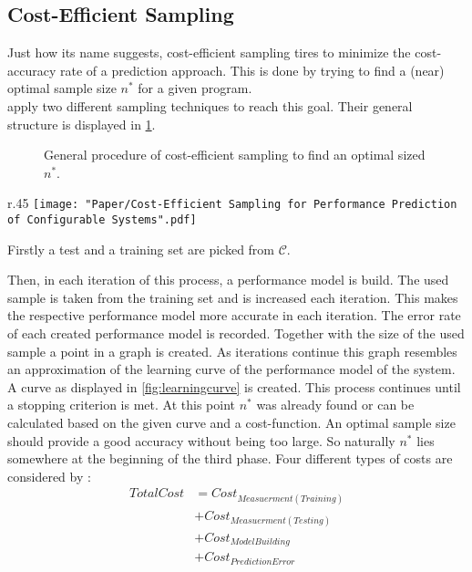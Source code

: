 \subsection{Cost-Efficient Sampling}\label{sec:CESampling}
Just how its name suggests, cost-efficient sampling tires to minimize the cost-accuracy rate of a prediction approach. This is done by trying to find a (near) optimal sample size $n^*$ for a given program.\\
\citet{CostEfficientSampling_Gou_Siegmund_2015} apply two different sampling techniques to reach this goal. Their general structure is displayed in \cref{fig:CEGeneral}.\\
\FloatBarrier
\begin{figure}[h]
	\centering
	\scalebox{.8}{
 		
 	}
 	\caption{General procedure of cost-efficient sampling to find an optimal sized $n^*$.}
 	\label{fig:CEGeneral}
\end{figure}
\begin{wrapfigure}{r}{.45\textwidth}	
	\texttt{[image: "Paper/Cost-Efficient Sampling for Performance Prediction of Configurable Systems".pdf]}
	\captionsetup{width=0.9\linewidth}
	\setlength{}
	\label{fig:learningcurve}
\end{wrapfigure}


Firstly a test and a training set are picked from $\mathcal{C}$.

Then, in each iteration of this process, a performance model is build. The used sample is taken from the training set and is increased each iteration. This makes the respective performance model more accurate in each iteration. The error rate of each created performance model is recorded. Together with the size of the used sample a point in a graph is created. As iterations continue this graph resembles an approximation of the learning curve of the performance model of the system. A curve as displayed in \cref{fig:learningcurve} is created. This process continues until  a stopping criterion is met. At this point $n^*$ was already found or can be calculated based on the given curve and a cost-function. An optimal sample size should provide a good accuracy without being too large. So naturally $n^*$ lies somewhere at the beginning of the third phase. 
Four different types of costs are considered by \citet{CostEfficientSampling_Gou_Siegmund_2015}:
\begin{equation}
\begin{split}
TotalCost &= Cost_{Measuerment(Training)}\\
&+ Cost_{Measuerment(Testing)}\\
&+ Cost_{ModelBuilding}\\
&+ Cost_{PredictionError}\\
\end{split}
\end{equation}

